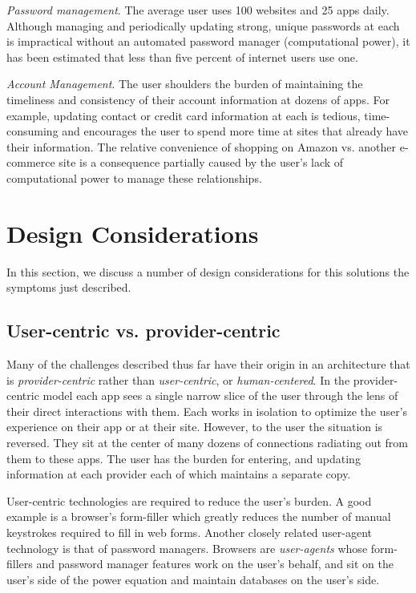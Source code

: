 \documentclass[11pt, oneside]{article}   	%
\begin{document}
\emph{Password management}. The average user uses 100 websites and 25 apps daily. Although managing and periodically updating strong, unique passwords at each is  impractical without an automated password manager (computational power), it has been estimated that less than five percent of internet users use one. 

\emph{Account Management}. The user shoulders the burden of maintaining the timeliness and consistency of their account information at dozens of apps. For example, updating contact or credit card information at each is tedious, time-consuming and encourages the user to spend more time at sites that already have their information. The relative convenience of shopping on Amazon vs. another e-commerce site is a consequence partially caused by the user's lack of computational power to manage these relationships.



\section{Design Considerations}%

In this section, we discuss a number of design considerations for this solutions the symptoms just described.

\subsection{User-centric vs. provider-centric}

Many of the challenges described thus far have their origin in an architecture that is \emph{provider-centric} rather than \emph{user-centric}, or \emph{human-centered}. In the provider-centric model each app sees a single narrow slice of the user through the lens of their direct interactions with them. Each works in isolation to optimize the user's experience on their app or at their site. However, to the user the situation is reversed. They sit at the center of many dozens of connections radiating out from them to these apps. The user has the burden for entering, and updating information at each provider each of which maintains a separate copy. 

User-centric technologies are required to reduce the user's burden. A good example is a browser's form-filler which greatly reduces the number of manual keystrokes required to fill in web forms.  Another closely related user-agent technology is that of password managers. Browsers are \emph{user-agents} whose form-fillers and password manager features work on the user's behalf, and sit on the user's side of the power equation and maintain databases on the user's side. 
\end{document}
